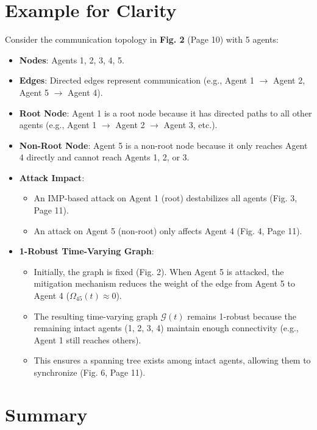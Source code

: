 \documentclass{article}
\begin{document}
\section{Example for Clarity}

Consider the communication topology in \textbf{Fig. 2} (Page 10) with 5 agents:
\begin{itemize}
    \item \textbf{Nodes}: Agents 1, 2, 3, 4, 5.
    \item \textbf{Edges}: Directed edges represent communication (e.g., Agent 1 $\rightarrow$ Agent 2, Agent 5 $\rightarrow$ Agent 4).
    \item \textbf{Root Node}: Agent 1 is a root node because it has directed paths to all other agents (e.g., Agent 1 $\rightarrow$ Agent 2 $\rightarrow$ Agent 3, etc.).
    \item \textbf{Non-Root Node}: Agent 5 is a non-root node because it only reaches Agent 4 directly and cannot reach Agents 1, 2, or 3.
    \item \textbf{Attack Impact}:
    \begin{itemize}
        \item An IMP-based attack on Agent 1 (root) destabilizes all agents (Fig. 3, Page 11).
        \item An attack on Agent 5 (non-root) only affects Agent 4 (Fig. 4, Page 11).
    \end{itemize}
    \item \textbf{1-Robust Time-Varying Graph}:
    \begin{itemize}
        \item Initially, the graph is fixed (Fig. 2). When Agent 5 is attacked, the mitigation mechanism reduces the weight of the edge from Agent 5 to Agent 4 ($\Omega_{45}(t) \approx 0$).
        \item The resulting time-varying graph $\mathcal{G}(t)$ remains 1-robust because the remaining intact agents (1, 2, 3, 4) maintain enough connectivity (e.g., Agent 1 still reaches others).
        \item This ensures a spanning tree exists among intact agents, allowing them to synchronize (Fig. 6, Page 11).
    \end{itemize}
\end{itemize}

\section{Summary}
\end{document}
